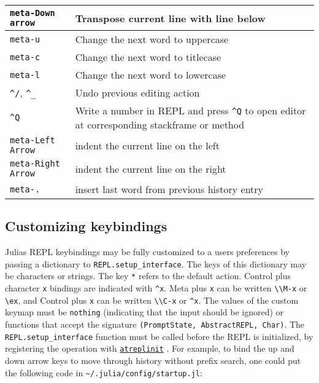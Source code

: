 \begin{table}[h]
\begin{tabulary}{\linewidth}{|L|L|}
\hline
\texttt{meta-Down arrow} & Transpose current line with line below \\
\hline
\texttt{meta-u} & Change the next word to uppercase \\
\hline
\texttt{meta-c} & Change the next word to titlecase \\
\hline
\texttt{meta-l} & Change the next word to lowercase \\
\hline
\texttt{{\textasciicircum}/}, \texttt{{\textasciicircum}\_} & Undo previous editing action \\
\hline
\texttt{{\textasciicircum}Q} & Write a number in REPL and press \texttt{{\textasciicircum}Q} to open editor at corresponding stackframe or method \\
\hline
\texttt{meta-Left Arrow} & indent the current line on the left \\
\hline
\texttt{meta-Right Arrow} & indent the current line on the right \\
\hline
\texttt{meta-.} & insert last word from previous history entry \\
\hline
\end{tabulary}

\end{table}



\hypertarget{12600332236460824227}{}


\subsection{Customizing keybindings}



Julia{\textquotesingle}s REPL keybindings may be fully customized to a user{\textquotesingle}s preferences by passing a dictionary to \texttt{REPL.setup\_interface}. The keys of this dictionary may be characters or strings. The key \texttt{{\textquotesingle}*{\textquotesingle}} refers to the default action. Control plus character \texttt{x} bindings are indicated with \texttt{{\textquotedbl}{\textasciicircum}x{\textquotedbl}}. Meta plus \texttt{x} can be written \texttt{{\textquotedbl}{\textbackslash}{\textbackslash}M-x{\textquotedbl}} or \texttt{{\textquotedbl}{\textbackslash}ex{\textquotedbl}}, and Control plus \texttt{x} can be written \texttt{{\textquotedbl}{\textbackslash}{\textbackslash}C-x{\textquotedbl}} or \texttt{{\textquotedbl}{\textasciicircum}x{\textquotedbl}}. The values of the custom keymap must be \texttt{nothing} (indicating that the input should be ignored) or functions that accept the signature \texttt{(PromptState, AbstractREPL, Char)}. The \texttt{REPL.setup\_interface} function must be called before the REPL is initialized, by registering the operation with \hyperlink{1741947168860119796}{\texttt{atreplinit}} . For example, to bind the up and down arrow keys to move through history without prefix search, one could put the following code in \texttt{{\textasciitilde}/.julia/config/startup.jl}:




